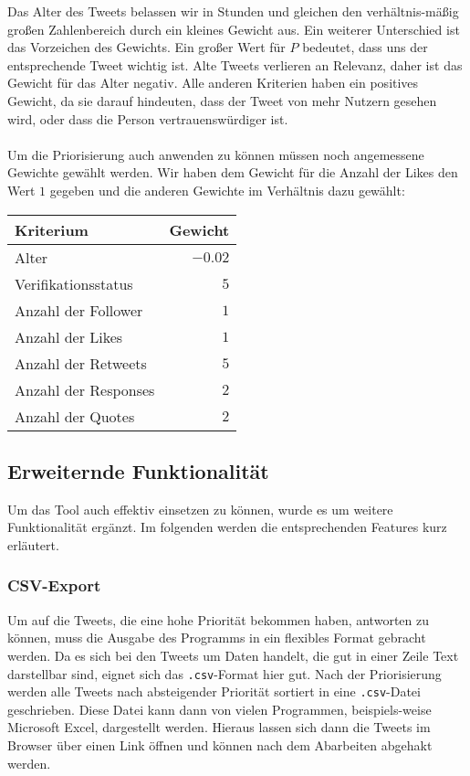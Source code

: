 \documentclass[runningheads]{llncs}
\begin{document}
Das Alter des Tweets belassen wir in Stunden und gleichen den verhältnis-mäßig großen Zahlenbereich durch ein kleines Gewicht aus.
Ein weiterer Unterschied ist das Vorzeichen des Gewichts.
Ein großer Wert für $P$ bedeutet, dass uns der entsprechende Tweet wichtig ist.
Alte Tweets verlieren an Relevanz, daher ist das Gewicht für das Alter negativ.
Alle anderen Kriterien haben ein positives Gewicht, da sie darauf hindeuten, dass der Tweet von mehr Nutzern gesehen wird, oder dass die Person vertrauenswürdiger ist.

\paragraph{} Um die Priorisierung auch anwenden zu können müssen noch angemessene Gewichte gewählt werden.
Wir haben dem Gewicht für die Anzahl der Likes den Wert $1$ gegeben und die anderen Gewichte im Verhältnis dazu gewählt:
\begin{center}
\begin{tabular}{lr}
    Kriterium & Gewicht \\
    \hline
    Alter & $-0.02$ \\
    Verifikationsstatus & $5$ \\
    Anzahl der Follower & $1$ \\
    Anzahl der Likes & $1$ \\
    Anzahl der Retweets & $5$ \\
    Anzahl der Responses & $2$ \\
    Anzahl der Quotes & $2$ 
\end{tabular}
\end{center}

\subsection{Erweiternde Funktionalität}
Um das Tool auch effektiv einsetzen zu können, wurde es um weitere Funktionalität ergänzt.
Im folgenden werden die entsprechenden Features kurz erläutert.

\subsubsection{CSV-Export}
Um auf die Tweets, die eine hohe Priorität bekommen haben, antworten zu können, muss die Ausgabe des Programms in ein flexibles Format gebracht werden.
Da es sich bei den Tweets um Daten handelt, die gut in einer Zeile Text darstellbar sind, eignet sich das \texttt{.csv}-Format hier gut.
Nach der Priorisierung werden alle Tweets nach absteigender Priorität sortiert in eine \texttt{.csv}-Datei geschrieben.
Diese Datei kann dann von vielen Programmen, beispiels-weise Microsoft Excel, dargestellt werden.
Hieraus lassen sich dann die Tweets im Browser über einen Link öffnen und können nach dem Abarbeiten abgehakt werden.
\end{document}
